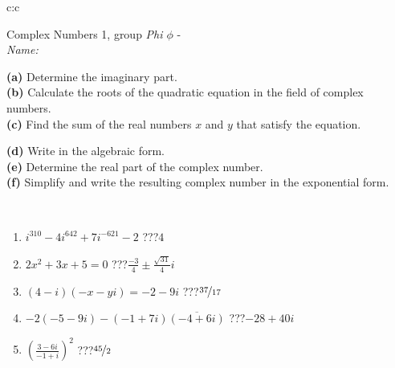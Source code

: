\documentclass[10pt]{report}
\begin{document}
\begin{tabular}{c:c}
\begin{minipage}[c][104.5mm][t]{0.5\linewidth}
\begin{center}
\vspace{5mm}
{\huge Complex Numbers 1, group \textit{Phi $\phi$} -}\\[5mm]
\textit{Name:}\phantom{xxxxxxxxxxxxxxxxxxxxxxxxxxxxxxxxxxxxxxxxxxxxxxxxxxxxxxxxxxxxxxxxx}\\[5mm]
\begin{minipage}{0.95\linewidth}
\begin{center}
{\small \begin{minipage}{0.44\textwidth} \raggedright
\textbf{(a)} Determine the imaginary part. \\[1mm]
\textbf{(b)} Calculate the roots of the quadratic equation in the field of complex numbers. \\[1mm]
\textbf{(c)} Find the sum of the real numbers \(x\) and \(y\) that satisfy the equation. \end{minipage} \begin{minipage}{0.54\textwidth}
\textbf{(d)} Write in the algebraic form. \\[1mm]
\textbf{(e)} Determine the real part of the complex number. \\[1mm]
\textbf{(f)} Simplify and write the resulting complex number in the exponential form.
\end{minipage}
} \vspace{3mm}
\end{center}
\end{minipage}
\\[1mm]
\begin{minipage}{0.79\linewidth}
\begin{center}
\begin{varwidth}{\linewidth}
\setlength{\itemsep}{0pt}
\begin{enumerate}
\large
\item $i^{310}-4i^{642}+7i^{-621}-2$\quad \dotfill\; ???\;\dotfill \quad $4$
\item $2x^2+3x+5=0$\quad \dotfill\; ???\;\dotfill \quad $\frac{-3}{4} \pm{}\frac{ \sqrt{31}}{4}i$
\item $(4-i)(-x-yi)=-2-9i$\quad \dotfill\; ???\;\dotfill \quad $\nicefrac{37}{17}$
\item $-2(-5-9i)-(-1+7i)\overline{(-4+6i)}$\quad \dotfill\; ???\;\dotfill \quad $-28+40i$
\item $\left(\frac{3-6i}{-1+i}\right)^2$\quad \dotfill\; ???\;\dotfill \quad $\nicefrac{45}{2}$

\end{enumerate}
\end{varwidth}
\end{center}
\end{minipage}
\end{center}
\end{minipage}
\end{tabular}
\end{document}
